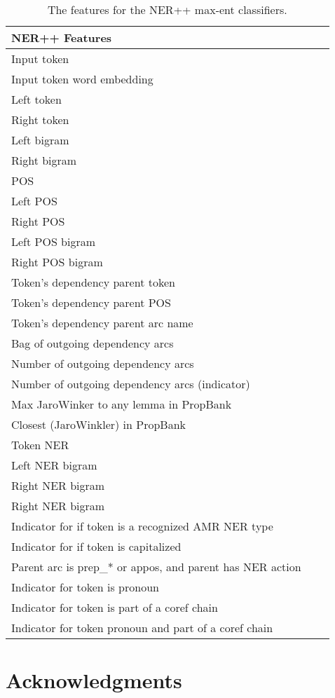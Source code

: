 \documentclass[11pt]{article}
\begin{document}
\begin{table}[h]
\begin{center}
\begin{tabular}{|l|rl|}
\hline \bf NER++ Features \\ \hline
Input token\\
Input token word embedding\\
Left token\\
Right token\\
Left bigram\\
Right bigram\\
POS\\
Left POS\\
Right POS\\
Left POS bigram\\
Right POS bigram\\
Token's dependency parent token\\
Token's dependency parent POS\\
Token's dependency parent arc name\\
Bag of outgoing dependency arcs\\
Number of outgoing dependency arcs\\
Number of outgoing dependency arcs (indicator)\\
Max JaroWinker to any lemma in PropBank\\
Closest (JaroWinkler) in PropBank\\
Token NER\\
Left NER bigram\\
Right NER bigram\\
Right NER bigram\\
Indicator for if token is a recognized AMR NER type\\
Indicator for if token is capitalized\\
Parent arc is prep\_* or appos, and parent has NER action\\
Indicator for token is pronoun\\
Indicator for token is part of a coref chain\\
Indicator for token pronoun and part of a coref chain\\
\hline
\end{tabular}
\end{center}
\caption{\label{font-table} The features for the NER++ max-ent classifiers. }
\end{table}

\section*{Acknowledgments}
\end{document}
